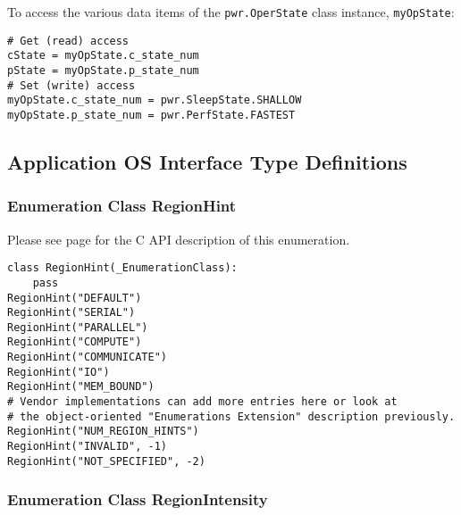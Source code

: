 To access the various data items of the \texttt{pwr.OperState} class instance,
\texttt{myOpState}: 

\begin{center}\begin{minipage}{.95\linewidth}\begin{lstlisting}
# Get (read) access
cState = myOpState.c_state_num
pState = myOpState.p_state_num
# Set (write) access
myOpState.c_state_num = pwr.SleepState.SHALLOW
myOpState.p_state_num = pwr.PerfState.FASTEST

\end{lstlisting}\end{minipage}\end{center}

\subsection{Application OS Interface Type Definitions}
\label{sec:PythonApplicationOSInterfaceTypeDefinitions}

\subsubsection{Enumeration Class RegionHint}\label{class:RegionHint}

Please see page \pageref{type:RegionHint} for the C API description of this
enumeration.

\begin{center}\begin{minipage}{.95\linewidth}\begin{lstlisting}
class RegionHint(_EnumerationClass):
    pass
RegionHint("DEFAULT")
RegionHint("SERIAL")
RegionHint("PARALLEL")
RegionHint("COMPUTE")
RegionHint("COMMUNICATE")
RegionHint("IO")
RegionHint("MEM_BOUND")
# Vendor implementations can add more entries here or look at  
# the object-oriented "Enumerations Extension" description previously. 
RegionHint("NUM_REGION_HINTS")
RegionHint("INVALID", -1)
RegionHint("NOT_SPECIFIED", -2)
\end{lstlisting}\end{minipage}\end{center}

\subsubsection{Enumeration Class RegionIntensity}\label{class:RegionIntensity}


